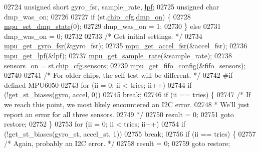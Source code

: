 \begin{DoxyCode}
{{{{{{{{{{{{{{{{{{{{{{{{{{{{{{{{{{02724     \textcolor{keywordtype}{unsigned} \textcolor{keywordtype}{short} gyro\_fsr, sample\_rate, \hyperlink{structgyro__reg__s_a0a4067140c6a3704b4312ba62b77aadb}{lpf};
02725     \textcolor{keywordtype}{unsigned} \textcolor{keywordtype}{char} dmp\_was\_on;
02726 
02727     \textcolor{keywordflow}{if} (st.\hyperlink{structgyro__state__s_ac895217592e2084bd520b0be8e9d20ee}{chip\_cfg}.\hyperlink{structchip__cfg__s_a49fb51079238683b21264827348b5968}{dmp\_on}) \{
02728         \hyperlink{group___d_r_i_v_e_r_s_ga68ed20e6c9663cd7c50469329af8715f}{mpu\_set\_dmp\_state}(0);
02729         dmp\_was\_on = 1;
02730     \} \textcolor{keywordflow}{else}
02731         dmp\_was\_on = 0;
02732 
02733     \textcolor{comment}{/* Get initial settings. */}
02734     \hyperlink{group___d_r_i_v_e_r_s_gaf973c32c73ba912ff512aab948fc31ca}{mpu\_get\_gyro\_fsr}(&gyro\_fsr);
02735     \hyperlink{group___d_r_i_v_e_r_s_gab6087a15ee23db23b6aec41590329a60}{mpu\_get\_accel\_fsr}(&accel\_fsr);
02736     \hyperlink{group___d_r_i_v_e_r_s_gaa95c7e216dcb2d888e9796001ca555f8}{mpu\_get\_lpf}(&lpf);
02737     \hyperlink{group___d_r_i_v_e_r_s_ga2487dd551b701c1c7ed4d6335f02b2f1}{mpu\_get\_sample\_rate}(&sample\_rate);
02738     sensors\_on = st.\hyperlink{structgyro__state__s_ac895217592e2084bd520b0be8e9d20ee}{chip\_cfg}.\hyperlink{structchip__cfg__s_aaa21c01566947e7007476657cb614e3f}{sensors};
02739     \hyperlink{group___d_r_i_v_e_r_s_ga093f11eb10b2639a4b9fe344ea348c54}{mpu\_get\_fifo\_config}(&fifo\_sensors);
02740 
02741     \textcolor{comment}{/* For older chips, the self-test will be different. */}
02742 \textcolor{preprocessor}{#if defined MPU6050}
02743     \textcolor{keywordflow}{for} (ii = 0; ii < tries; ii++)
02744         \textcolor{keywordflow}{if} (!get\_st\_biases(gyro, accel, 0))
02745             \textcolor{keywordflow}{break};
02746     \textcolor{keywordflow}{if} (ii == tries) \{
02747         \textcolor{comment}{/* If we reach this point, we most likely encountered an I2C error.}
02748 \textcolor{comment}{         * We'll just report an error for all three sensors.}
02749 \textcolor{comment}{         */}
02750         result = 0;
02751         \textcolor{keywordflow}{goto} restore;
02752     \}
02753     \textcolor{keywordflow}{for} (ii = 0; ii < tries; ii++)
02754         \textcolor{keywordflow}{if} (!get\_st\_biases(gyro\_st, accel\_st, 1))
02755             \textcolor{keywordflow}{break};
02756     \textcolor{keywordflow}{if} (ii == tries) \{
02757         \textcolor{comment}{/* Again, probably an I2C error. */}
02758         result = 0;
02759         \textcolor{keywordflow}{goto} restore;
}}}}}}}}}}}}}}}}}}}}}}}}}}}}}}}}}}
\end{DoxyCode}
